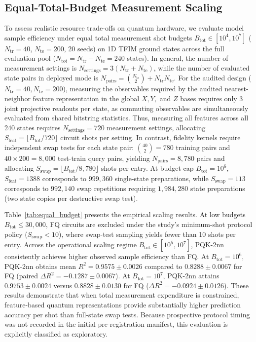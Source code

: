 \documentclass[conference]{IEEEtran}
\begin{document}


\subsection{Equal-Total-Budget Measurement Scaling}
\label{sec:equal_budget}
To assess realistic resource trade-offs on quantum hardware, we evaluate model sample efficiency under equal total measurement shot budgets $B_{\mathrm{tot}} \in [10^4, 10^7]$ ($N_{\mathrm{tr}}=40$, $N_{\mathrm{te}}=200$, 20 seeds) on 1D TFIM ground states across the full evaluation pool ($N_{\mathrm{tot}} = N_{\mathrm{tr}} + N_{\mathrm{te}} = 240$ states). In general, the number of measurement settings is $N_{\mathrm{settings}} = 3(N_{\mathrm{tr}} + N_{\mathrm{te}})$, while the number of evaluated state pairs in deployed mode is $N_{\mathrm{pairs}} = \binom{N_{\mathrm{tr}}}{2} + N_{\mathrm{tr}} N_{\mathrm{te}}$. For the audited design ($N_{\mathrm{tr}}=40, N_{\mathrm{te}}=200$), measuring the observables required by the audited nearest-neighbor feature representation in the global $X, Y,$ and $Z$ bases requires only 3 joint projective readouts per state, as commuting observables are simultaneously evaluated from shared bitstring statistics. Thus, measuring all features across all 240 states requires $N_{\mathrm{settings}} = 720$ measurement settings, allocating $S_{\mathrm{feat}} = \lfloor B_{\mathrm{tot}} / 720 \rfloor$ circuit shots per setting. In contrast, fidelity kernels require independent swap tests for each state pair: $\binom{40}{2} = 780$ training pairs and $40 \times 200 = 8{,}000$ test-train query pairs, yielding $N_{\mathrm{pairs}} = 8{,}780$ pairs and allocating $S_{\mathrm{swap}} = \lfloor B_{\mathrm{tot}} / 8{,}780 \rfloor$ shots per entry. At budget cap $B_{\mathrm{tot}}=10^6$, $S_{\mathrm{feat}}=1388$ corresponds to $999{,}360$ single-state preparations, while $S_{\mathrm{swap}}=113$ corresponds to $992{,}140$ swap repetitions requiring $1{,}984{,}280$ state preparations (two state copies per destructive swap test).

Table~\ref{tab:equal_budget} presents the empirical scaling results. At low budgets $B_{\mathrm{tot}} \le 30{,}000$, FQ circuits are excluded under the study's minimum-shot protocol policy ($S_{\mathrm{swap}} < 10$), where swap-test sampling yields fewer than 10 shots per entry. Across the operational scaling regime $B_{\mathrm{tot}} \in [10^5, 10^7]$, PQK-2nn consistently achieves higher observed sample efficiency than FQ. At $B_{\mathrm{tot}}=10^6$, PQK-2nn obtains mean $R^2 = 0.9575 \pm 0.0026$ compared to $0.8288 \pm 0.0067$ for FQ (paired $\Delta R^2 = -0.1287 \pm 0.0067$). At $B_{\mathrm{tot}}=10^7$, PQK-2nn attains $0.9753 \pm 0.0024$ versus $0.8828 \pm 0.0130$ for FQ ($\Delta R^2 = -0.0924 \pm 0.0126$). These results demonstrate that when total measurement expenditure is constrained, feature-based quantum representations provide substantially higher prediction accuracy per shot than full-state swap tests. Because prospective protocol timing was not recorded in the initial pre-registration manifest, this evaluation is explicitly classified as exploratory.
\end{document}
